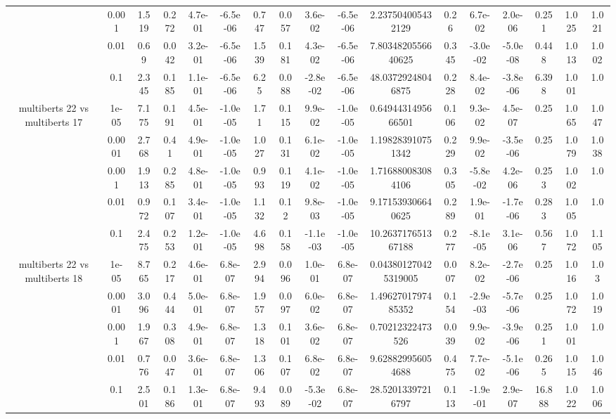 \begin{tabular}{|c|c|c|c|c|c|c|c|c|c|c|c|c|c|c|c|c|}
 & 0.001 & 1.519 & 0.272 & 4.7e-01 & -6.5e-06 & 0.747 & 0.057 & 3.6e-02 & -6.5e-06 & 2.237504005432129 & 0.26 & 6.7e-02 & 2.0e-06 & 0.251 & 1.025 & 1.021 \\
 & 0.01 & 0.69 & 0.042 & 3.2e-01 & -6.5e-06 & 1.539 & 0.181 & 4.3e-02 & -6.5e-06 & 7.8034820556640625 & 0.345 & -3.0e-02 & -5.0e-08 & 0.448 & 1.013 & 1.002 \\
 & 0.1 & 2.345 & 0.185 & 1.1e-01 & -6.5e-06 & 6.25 & 0.088 & -2.8e-02 & -6.5e-06 & 48.03729248046875 & 0.228 & 8.4e-02 & -3.8e-06 & 6.398 & 1.001 & 1.0 \\
\hline
\multirow{5}{*}{multiberts 22 vs multiberts 17} & 1e-05 & 7.175 & 0.191 & 4.5e-01 & -1.0e-05 & 1.71 & 0.115 & 9.9e-02 & -1.0e-05 & 0.6494431495666501 & 0.106 & 9.3e-02 & 4.5e-07 & 0.25 & 1.065 & 1.047 \\
 & 0.0001 & 2.768 & 0.41 & 4.9e-01 & -1.0e-05 & 1.027 & 0.131 & 6.1e-02 & -1.0e-05 & 1.198283910751342 & 0.229 & 9.9e-02 & -3.5e-06 & 0.25 & 1.079 & 1.038 \\
 & 0.001 & 1.913 & 0.285 & 4.8e-01 & -1.0e-05 & 0.993 & 0.119 & 4.1e-02 & -1.0e-05 & 1.716880083084106 & 0.305 & -5.8e-02 & 4.2e-06 & 0.253 & 1.002 & 1.0 \\
 & 0.01 & 0.972 & 0.107 & 3.4e-01 & -1.0e-05 & 1.132 & 0.12 & 9.8e-03 & -1.0e-05 & 9.171539306640625 & 0.289 & 1.9e-01 & -1.7e-06 & 0.283 & 1.005 & 1.0 \\
 & 0.1 & 2.475 & 0.253 & 1.2e-01 & -1.0e-05 & 4.698 & 0.158 & -1.1e-03 & -1.0e-05 & 10.263717651367188 & 0.277 & -8.1e-05 & 3.1e-06 & 0.567 & 1.072 & 1.105 \\
\hline
\multirow{5}{*}{multiberts 22 vs multiberts 18} & 1e-05 & 8.765 & 0.217 & 4.6e-01 & 6.8e-07 & 2.994 & 0.096 & 1.0e-01 & 6.8e-07 & 0.043801270425319005 & 0.007 & 8.2e-02 & -2.7e-06 & 0.25 & 1.016 & 1.03 \\
 & 0.0001 & 3.096 & 0.444 & 5.0e-01 & 6.8e-07 & 1.957 & 0.097 & 6.0e-02 & 6.8e-07 & 1.4962701797485352 & 0.154 & -2.9e-03 & -5.7e-06 & 0.25 & 1.072 & 1.019 \\
 & 0.001 & 1.967 & 0.308 & 4.9e-01 & 6.8e-07 & 1.318 & 0.101 & 3.6e-02 & 6.8e-07 & 0.70212322473526 & 0.039 & 9.9e-02 & -3.9e-06 & 0.251 & 1.001 & 1.0 \\
 & 0.01 & 0.776 & 0.047 & 3.6e-01 & 6.8e-07 & 1.306 & 0.107 & 6.8e-02 & 6.8e-07 & 9.628829956054688 & 0.475 & 7.7e-02 & -5.1e-06 & 0.265 & 1.015 & 1.046 \\
 & 0.1 & 2.501 & 0.186 & 1.3e-01 & 6.8e-07 & 9.493 & 0.089 & -5.3e-02 & 6.8e-07 & 28.52013397216797 & 0.113 & -1.9e-01 & 2.9e-07 & 16.888 & 1.022 & 1.006 \\

\end{tabular}

